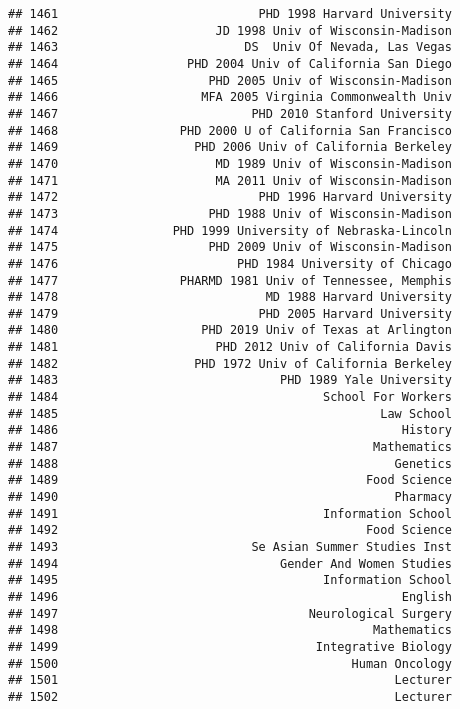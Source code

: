 \documentclass[
]{article}
\begin{document}
\begin{verbatim}
## 1461                            PHD 1998 Harvard University
## 1462                      JD 1998 Univ of Wisconsin-Madison
## 1463                          DS  Univ Of Nevada, Las Vegas
## 1464                  PHD 2004 Univ of California San Diego
## 1465                     PHD 2005 Univ of Wisconsin-Madison
## 1466                    MFA 2005 Virginia Commonwealth Univ
## 1467                           PHD 2010 Stanford University
## 1468                 PHD 2000 U of California San Francisco
## 1469                   PHD 2006 Univ of California Berkeley
## 1470                      MD 1989 Univ of Wisconsin-Madison
## 1471                      MA 2011 Univ of Wisconsin-Madison
## 1472                            PHD 1996 Harvard University
## 1473                     PHD 1988 Univ of Wisconsin-Madison
## 1474                PHD 1999 University of Nebraska-Lincoln
## 1475                     PHD 2009 Univ of Wisconsin-Madison
## 1476                         PHD 1984 University of Chicago
## 1477                 PHARMD 1981 Univ of Tennessee, Memphis
## 1478                             MD 1988 Harvard University
## 1479                            PHD 2005 Harvard University
## 1480                    PHD 2019 Univ of Texas at Arlington
## 1481                      PHD 2012 Univ of California Davis
## 1482                   PHD 1972 Univ of California Berkeley
## 1483                               PHD 1989 Yale University
## 1484                                     School For Workers
## 1485                                             Law School
## 1486                                                History
## 1487                                            Mathematics
## 1488                                               Genetics
## 1489                                           Food Science
## 1490                                               Pharmacy
## 1491                                     Information School
## 1492                                           Food Science
## 1493                           Se Asian Summer Studies Inst
## 1494                               Gender And Women Studies
## 1495                                     Information School
## 1496                                                English
## 1497                                   Neurological Surgery
## 1498                                            Mathematics
## 1499                                    Integrative Biology
## 1500                                         Human Oncology
## 1501                                               Lecturer
## 1502                                               Lecturer

\end{verbatim}
\end{document}
